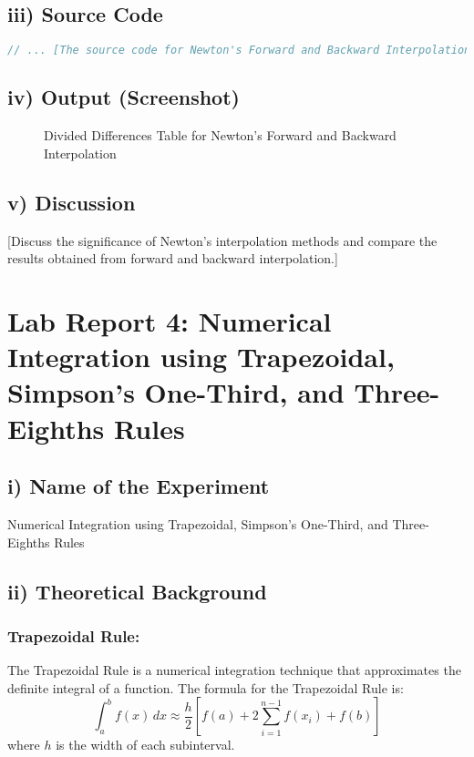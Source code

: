 \documentclass[a4paper,12pt]{article}
\begin{document}
\subsection*{iii) Source Code}
\begin{lstlisting}[language=C++]
// ... [The source code for Newton's Forward and Backward Interpolation]
\end{lstlisting}

\subsection*{iv) Output (Screenshot)}
\begin{figure}[H]
    \centering
    \caption{Divided Differences Table for Newton's Forward and Backward Interpolation}
\end{figure}

\subsection*{v) Discussion}
[Discuss the significance of Newton's interpolation methods and compare the results obtained from forward and backward interpolation.]

\newpage

\section*{Lab Report 4: Numerical Integration using Trapezoidal, Simpson's One-Third, and Three-Eighths Rules}

\subsection*{i) Name of the Experiment}
Numerical Integration using Trapezoidal, Simpson's One-Third, and Three-Eighths Rules

\subsection*{ii) Theoretical Background}
\subsubsection*{Trapezoidal Rule:}
The Trapezoidal Rule is a numerical integration technique that approximates the definite integral of a function. The formula for the Trapezoidal Rule is:
\[ \int_{a}^{b} f(x) \,dx \approx \frac{h}{2} \left[ f(a) + 2\sum_{i=1}^{n-1} f(x_i) + f(b) \right] \]
where \(h\) is the width of each subinterval.
\end{document}
